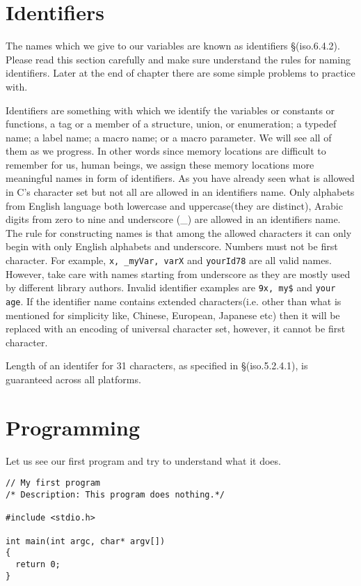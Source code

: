 \section{Identifiers}
The names which we give to our variables are known as identifiers
\S(iso.6.4.2). Please read this section carefully and make sure understand
the rules for naming identifiers. Later at the end of chapter there are some
simple problems to practice with.

Identifiers are something  with which we identify the variables or constants or
functions, a tag or a member of a structure, union, or
enumeration; a typedef name; a label name; a macro name; or a macro
parameter. We will see all of them as we progress. In other words 
since memory locations are difficult to remember for us, human beings, we
assign these memory locations more meaningful names in form of identifiers. As
you have already seen what is allowed  in C's character set but not all are
allowed in an identifiers name. Only alphabets from English language both
lowercase and uppercase(they are distinct),
Arabic digits from zero to nine and underscore (\_) are allowed in an
identifiers name. The rule for constructing names is that among the allowed
characters it can only begin with only English alphabets and
underscore. Numbers must not be first character. For example, \texttt{x,
  \_myVar, varX} and \texttt{yourId78} are all valid names. However, take care
with names starting from underscore as they are mostly used by different
library authors. Invalid identifier examples are \texttt{9x, my\$} and
\texttt{your age}. If the identifier name contains extended
characters(i.e. other than what is mentioned for simplicity like, Chinese,
European, Japanese etc) then it will be replaced with an encoding of universal
character set, however, it cannot be first character.

Length of an identifer for 31 characters, as specified in \S(iso.5.2.4.1), is
guaranteed across all platforms.

\section{Programming}
Let us see our first program and try to understand what it does.

\begin{verbatim}
// My first program
/* Description: This program does nothing.*/

#include <stdio.h>

int main(int argc, char* argv[])
{
  return 0;
}
\end{verbatim}

